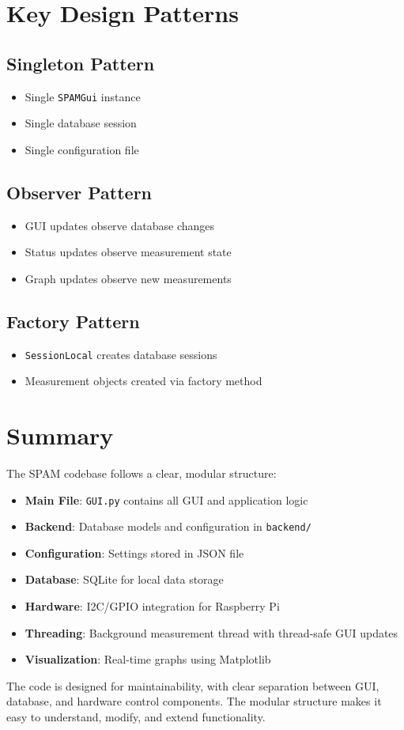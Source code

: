 \documentclass[11pt,a4paper]{article}
\begin{document}
\section{Key Design Patterns}

\subsection{Singleton Pattern}
\begin{itemize}
    \item Single \texttt{SPAMGui} instance
    \item Single database session
    \item Single configuration file
\end{itemize}

\subsection{Observer Pattern}
\begin{itemize}
    \item GUI updates observe database changes
    \item Status updates observe measurement state
    \item Graph updates observe new measurements
\end{itemize}

\subsection{Factory Pattern}
\begin{itemize}
    \item \texttt{SessionLocal} creates database sessions
    \item Measurement objects created via factory method
\end{itemize}

\section{Summary}

The SPAM codebase follows a clear, modular structure:
\begin{itemize}
    \item \textbf{Main File}: \texttt{GUI.py} contains all GUI and application logic
    \item \textbf{Backend}: Database models and configuration in \texttt{backend/}
    \item \textbf{Configuration}: Settings stored in JSON file
    \item \textbf{Database}: SQLite for local data storage
    \item \textbf{Hardware}: I2C/GPIO integration for Raspberry Pi
    \item \textbf{Threading}: Background measurement thread with thread-safe GUI updates
    \item \textbf{Visualization}: Real-time graphs using Matplotlib
\end{itemize}

The code is designed for maintainability, with clear separation between GUI, database, and hardware control components. The modular structure makes it easy to understand, modify, and extend functionality.
\end{document}
